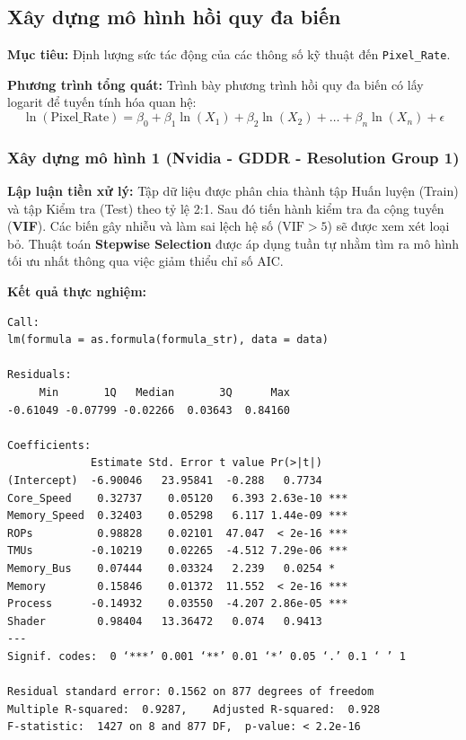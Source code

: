 \subsection{Xây dựng mô hình hồi quy đa biến}

\textbf{Mục tiêu:} Định lượng sức tác động của các thông số kỹ thuật đến \texttt{Pixel\_Rate}.

\textbf{Phương trình tổng quát:} Trình bày phương trình hồi quy đa biến có lấy logarit để tuyến tính hóa quan hệ:
\begin{equation}
    \ln(\text{Pixel\_Rate}) = \beta_0 + \beta_1 \ln(X_1) + \beta_2 \ln(X_2) + \dots + \beta_n \ln(X_n) + \epsilon
\end{equation}

\subsubsection{Xây dựng mô hình 1 (Nvidia - GDDR - Resolution Group 1)}

\textbf{Lập luận tiền xử lý:} Tập dữ liệu được phân chia thành tập Huấn luyện (Train) và tập Kiểm tra (Test) theo tỷ lệ 2:1. Sau đó tiến hành kiểm tra đa cộng tuyến (\textbf{VIF}). Các biến gây nhiễu và làm sai lệch hệ số ($\text{VIF} > 5$) sẽ được xem xét loại bỏ. Thuật toán \textbf{Stepwise Selection} được áp dụng tuần tự nhằm tìm ra mô hình tối ưu nhất thông qua việc giảm thiểu chỉ số AIC.

\textbf{Kết quả thực nghiệm:}
\begin{center}
\begin{minipage}{0.85\textwidth}
\begin{mdframed}
\begin{verbatim}
Call:
lm(formula = as.formula(formula_str), data = data)

Residuals:
     Min       1Q   Median       3Q      Max 
-0.61049 -0.07799 -0.02266  0.03643  0.84160 

Coefficients:
             Estimate Std. Error t value Pr(>|t|)    
(Intercept)  -6.90046   23.95841  -0.288   0.7734    
Core_Speed    0.32737    0.05120   6.393 2.63e-10 ***
Memory_Speed  0.32403    0.05298   6.117 1.44e-09 ***
ROPs          0.98828    0.02101  47.047  < 2e-16 ***
TMUs         -0.10219    0.02265  -4.512 7.29e-06 ***
Memory_Bus    0.07444    0.03324   2.239   0.0254 *  
Memory        0.15846    0.01372  11.552  < 2e-16 ***
Process      -0.14932    0.03550  -4.207 2.86e-05 ***
Shader        0.98404   13.36472   0.074   0.9413    
---
Signif. codes:  0 ‘***’ 0.001 ‘**’ 0.01 ‘*’ 0.05 ‘.’ 0.1 ‘ ’ 1

Residual standard error: 0.1562 on 877 degrees of freedom
Multiple R-squared:  0.9287,    Adjusted R-squared:  0.928 
F-statistic:  1427 on 8 and 877 DF,  p-value: < 2.2e-16
\end{verbatim}
\end{mdframed}
\end{minipage}
\end{center}

